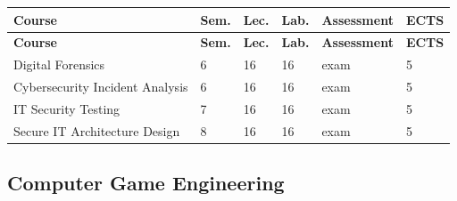 \documentclass[12pt,a4paper]{article}
\newcommand{\thdrule}{\noalign{\global\setlength{\extrarowheight}{0pt}}}
\newcommand{\thdend}{\noalign{\global\setlength{\extrarowheight}{4pt}}}
\begin{document}
{\scriptsize
\begin{longtable}{m{6.5cm}m{0.7cm}m{1cm}m{1cm}m{1.7cm}m{0.7cm}}
\thdrule\toprule
\rowcolor{pjatkRed}
{\color{white}\footnotesize\textbf{\vphantom{Ag}Course}} & {\color{white}\footnotesize\textbf{\vphantom{Ag}Sem.}} & {\color{white}\footnotesize\textbf{\vphantom{Ag}Lec.}} & {\color{white}\footnotesize\textbf{\vphantom{Ag}Lab.}} & {\color{white}\footnotesize\textbf{\vphantom{Ag}Assessment}} & {\color{white}\footnotesize\textbf{\vphantom{Ag}ECTS}} \\
\midrule\thdend
\endfirsthead
\thdrule\toprule
\rowcolor{pjatkRed}
{\color{white}\footnotesize\textbf{\vphantom{Ag}Course}} & {\color{white}\footnotesize\textbf{\vphantom{Ag}Sem.}} & {\color{white}\footnotesize\textbf{\vphantom{Ag}Lec.}} & {\color{white}\footnotesize\textbf{\vphantom{Ag}Lab.}} & {\color{white}\footnotesize\textbf{\vphantom{Ag}Assessment}} & {\color{white}\footnotesize\textbf{\vphantom{Ag}ECTS}} \\
\midrule\thdend
\endhead
\rowcolor{tableRowLight} Digital Forensics & 6 & 16 & 16 & {\scriptsize exam} & 5 \\
\rowcolor{tableRowAlt} Cybersecurity Incident Analysis & 6 & 16 & 16 & {\scriptsize exam} & 5 \\
\rowcolor{tableRowLight} IT Security Testing & 7 & 16 & 16 & {\scriptsize exam} & 5 \\
\rowcolor{tableRowAlt} Secure IT Architecture Design & 8 & 16 & 16 & {\scriptsize exam} & 5 \\
\bottomrule
\end{longtable}}

\subsection*{Computer Game Engineering}
\end{document}
